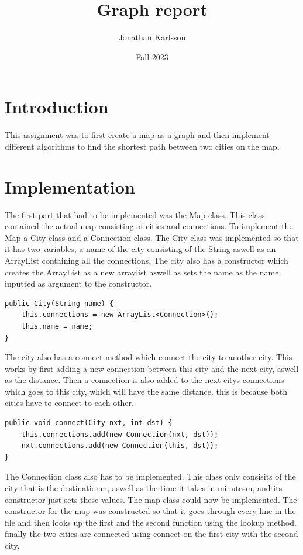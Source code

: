 \documentclass[a4paper,11pt]{article}
\begin{document}
\title{
    \textbf{Graph report}
}
\author{Jonathan Karlsson}
\date{Fall 2023}

\maketitle

\section*{Introduction}

This assignment was to first create a map as a graph and then implement different algorithms to find the shortest path between two cities on the map.

\section*{Implementation}
The first part that had to be implemented was the Map class. This class contained the actual map consisting of cities and connections. To implement the Map a City class and a Connection class. 
The City class was implemented so that it has two variables, a name of the city consisting of the String aswell as an ArrayList containing all the connections. The city also has a constructor which creates the ArrayList as a new arraylist aswell as sets the name as the name 
inputted as argument to the constructor. 
\begin{verbatim}
public City(String name) {
    this.connections = new ArrayList<Connection>();
    this.name = name;
}
\end{verbatim}
The city also has a connect method which connect the city to another city. This works by first adding a new connection between this city and the next city, aswell as the distance. Then a connection is also added to the 
next citys connections which goes to this city, which will have the same distance. this is because both cities have to connect to each other.
\begin{verbatim}
public void connect(City nxt, int dst) {
    this.connections.add(new Connection(nxt, dst));
    nxt.connections.add(new Connection(this, dst));
}    
\end{verbatim}
The Connection class also has to be implemented. This class only consisits of the city that is the destinationm, aswell as the time it takes in minutesm, and its constructor just sets these values.
The map class could now be implemented. The constructor for the map was constructed so that it goes through every line in the file and then looks up the first and the second function using the lookup method. finally the two cities are connected using connect on the first city with the second city.
\end{document}

